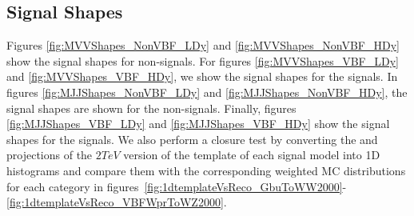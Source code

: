 \subsection{Signal Shapes}

Figures \ref{fig:MVVShapes_NonVBF_LDy} and \ref{fig:MVVShapes_NonVBF_HDy} show the \MVV signal shapes for non-\VBF signals.
For figures \ref{fig:MVVShapes_VBF_LDy} and \ref{fig:MVVShapes_VBF_HDy}, we show the \MVV signal shapes for the \VBF signals.
In figures \ref{fig:MJJShapes_NonVBF_LDy} and \ref{fig:MJJShapes_NonVBF_HDy}, the \MJ signal shapes are shown for the non-\VBF signals.
Finally, figures \ref{fig:MJJShapes_VBF_LDy} and \ref{fig:MJJShapes_VBF_HDy} show the \MJ signal shapes for the \VBF signals.
We also perform a closure test by converting the \MVV and \MJ projections of the $2\unit{TeV}$ version of the template of each signal model into 1D histograms and compare them with the corresponding weighted MC distributions for each category in figures~\ref{fig:1dtemplateVsReco_GbuToWW2000}-\ref{fig:1dtemplateVsReco_VBFWprToWZ2000}.

